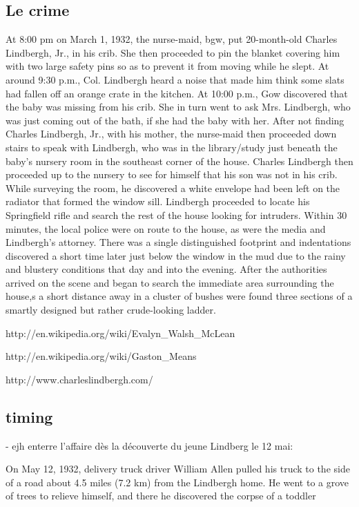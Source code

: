 \subsection{Le crime}


 At 8:00 pm on March 1, 1932, the nurse-maid, \gls{bgw}, put 20-month-old Charles Lindbergh, Jr., in his crib. 
She then proceeded to pin the blanket covering him with two large safety pins so as to prevent it from moving while he slept.
At around 9:30 p.m., Col. Lindbergh heard a noise that made him think some slats had fallen off an orange crate in the kitchen. 
At 10:00 p.m., Gow discovered that the baby was missing from his crib. She in turn went to ask Mrs. Lindbergh, who was just coming
 out of the bath, if she had the baby with her. After not finding Charles Lindbergh, Jr., with his mother, 
the nurse-maid then proceeded down stairs to speak with Lindbergh, who was in the library/study just beneath the baby's nursery room 
in the southeast corner of the house. Charles Lindbergh then proceeded up to the nursery to see for himself that his son was not in his crib. 
While surveying the room, he discovered a white envelope had been left on the radiator that formed the window sill. Lindbergh 
proceeded to locate his Springfield rifle and search the rest of the house looking for intruders. Within 30 minutes, the local 
police were on route to the house, as were the media and Lindbergh's attorney. There was a single distinguished footprint and 
indentations discovered a short time later just below the window in the mud due to the rainy and blustery conditions that day 
and into the evening. After the authorities arrived on the scene and began to search the immediate area surrounding the house,s
 a short distance away in a cluster of bushes were found three sections of a smartly designed but rather crude-looking ladder.

http://en.wikipedia.org/wiki/Evalyn\_Walsh\_McLean

http://en.wikipedia.org/wiki/Gaston\_Means

http://www.charleslindbergh.com/





\subsection{timing}

- \gls{ejh} enterre l'affaire dès la découverte du jeune Lindberg le 12 mai:

On May 12, 1932, delivery truck driver William Allen pulled his truck to the side of a road about 4.5 miles (7.2 km) from the Lindbergh home. He went to a grove of trees to relieve himself, and there he discovered the corpse of a toddler
